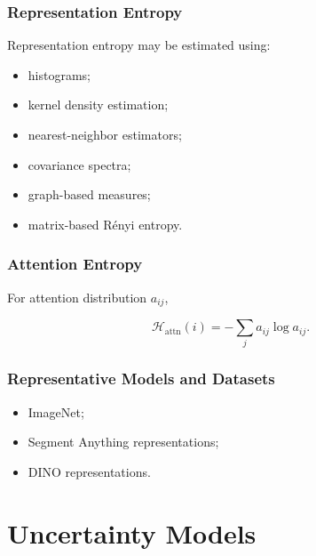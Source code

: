 \documentclass[11pt,oneside]{book}
\theoremstyle{remark}
\newcommand{\Entropy}{\mathcal{H}}
\newenvironment{datasetlist}
{
	\begin{itemize}[label=\(\triangleright\)]
	}
	{
	\end{itemize}
}
\begin{document}
	\section{Representation Entropy}
	
	Representation entropy may be estimated using:
	
	\begin{itemize}
		\item histograms;
		\item kernel density estimation;
		\item nearest-neighbor estimators;
		\item covariance spectra;
		\item graph-based measures;
		\item matrix-based Rényi entropy.
	\end{itemize}
	
	\section{Attention Entropy}
	
	For attention distribution \(a_{ij}\),
	
	\[
	\Entropy_{\mathrm{attn}}(i)
	=
	-\sum_j a_{ij}\log a_{ij}.
	\]
	
	\section*{Representative Models and Datasets}
	
	\begin{datasetlist}
		\item ImageNet;
		\item Segment Anything representations;
		\item DINO representations.
	\end{datasetlist}
	
	
	\part{Uncertainty Models}
	
	
\end{document}
